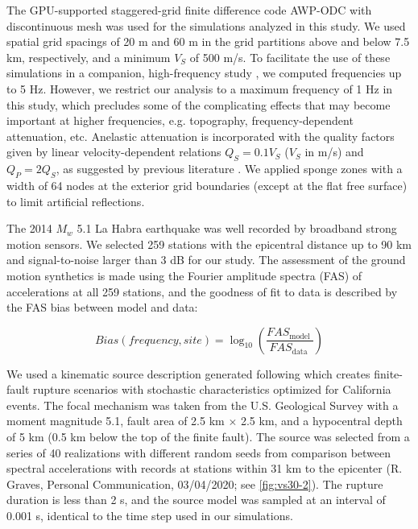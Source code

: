 The GPU-supported staggered-grid finite difference code AWP-ODC \citep[Anelastic Wave Propagation - Olsen, Day, and Cui, from the authors of the code;][]{cuiScalableEarthquakeSimulation2010} with discontinuous mesh \citep{nieFourthOrderStaggered2017} was used for the simulations analyzed in this study. We used spatial grid spacings of 20 m and 60 m in the grid partitions above and below 7.5 km, respectively, and a minimum $V_S$ of 500 m/s. To facilitate the use of these simulations in a companion, high-frequency study \citep{hu05HzDeterministic2021}, we computed frequencies up to 5 Hz. However, we restrict our analysis to a maximum frequency of 1 Hz in this study, which precludes some of the complicating effects that may become important at higher frequencies, e.g. topography, frequency-dependent attenuation, etc.
Anelastic attenuation is incorporated with the quality factors given by linear velocity-dependent relations $Q_S=0.1V_S$ ($V_S$ in m/s) and $Q_P=2Q_S$, as suggested by previous literature . We applied sponge zones \citep{cerjanNonreflectingBoundaryCondition1985} with a width of 64 nodes at the exterior grid boundaries (except at the flat free surface) to limit artificial reflections.

The 2014 $M_w$ 5.1 La Habra earthquake was well recorded by broadband strong motion sensors. We selected 259 stations with the epicentral distance up to 90 km and signal-to-noise larger than 3 dB for our study. The assessment of the ground motion synthetics is made using the Fourier amplitude spectra (FAS) of accelerations at all 259 stations, and the goodness of fit to data is described by the FAS bias between model and data:

\begin{equation}\label{eq:vs30-1}
  Bias(frequency, site)=\log_{10}\left(\frac{F A S_{\text {model }}}{F A S_{\text{data }}}\right)
\end{equation}

We used a kinematic source description generated following \citet{gravesKinematicGroundMotion2016} which creates finite-fault rupture scenarios with stochastic characteristics optimized for California events. The focal mechanism was taken from the U.S. Geological Survey \citep[strike=233$^\circ$, dip=77$^\circ$, rake=49$^\circ$;][]{usgsEarthquakeEventsFocal2014} with a moment magnitude 5.1, fault area of 2.5 km $\times$ 2.5 km, and a hypocentral depth of 5 km (0.5 km below the top of the finite fault). The source was selected from a series of 40 realizations with different random seeds from comparison between spectral accelerations with records at stations within 31 km to the epicenter (R. Graves, Personal Communication, 03/04/2020; see \cref{fig:vs30-2}). The rupture duration is less than 2 s, and the source model was sampled at an interval of 0.001 s, identical to the time step used in our simulations.

